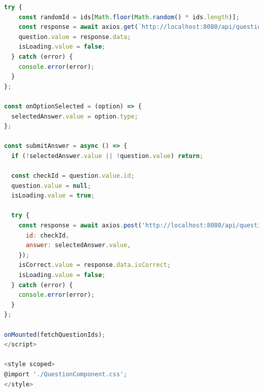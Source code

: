 \documentclass[biblatex]{lni}
\begin{document}
\begin{lstlisting}[caption={QuestionComponent.vue}, label=qc-ve, language=javascript]
  try {
    const randomId = ids[Math.floor(Math.random() * ids.length)];
    const response = await axios.get(`http://localhost:8080/api/question/${randomId}`);
    question.value = response.data;
    isLoading.value = false;
  } catch (error) {
    console.error(error);
  }
};

const onOptionSelected = (option) => {
  selectedAnswer.value = option.type;
};

const submitAnswer = async () => {
  if (!selectedAnswer.value || !question.value) return;

  const checkId = question.value.id;
  question.value = null;
  isLoading.value = true;

  try {
    const response = await axios.post('http://localhost:8080/api/question', {
      id: checkId,
      answer: selectedAnswer.value,
    });
    isCorrect.value = response.data.isCorrect;
    isLoading.value = false;
  } catch (error) {
    console.error(error);
  }
};

onMounted(fetchQuestionIds);
</script>

<style scoped>
@import './QuestionComponent.css';
</style>
\end{lstlisting}
\end{document}
